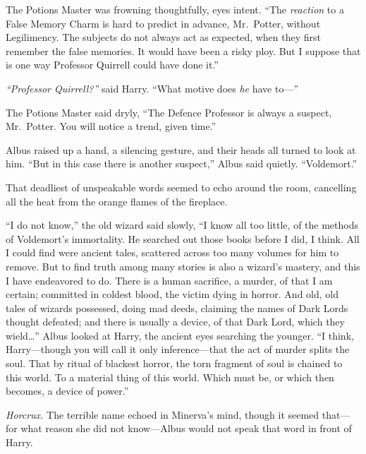The Potions Master was frowning thoughtfully, eyes intent. ``The
\emph{reaction} to a False Memory Charm is hard to predict in advance,
Mr.~Potter, without Legilimency. The subjects do not always act as
expected, when they first remember the false memories. It would have
been a risky ploy. But I suppose that is one way Professor Quirrell
could have done it.''

\emph{``Professor Quirrell?''} said Harry. ``What motive does \emph{he}
have to---''

The Potions Master said dryly, ``The Defence Professor is always a
suspect, Mr.~Potter. You will notice a trend, given time.''

Albus raised up a hand, a silencing gesture, and their heads all turned
to look at him. ``But in this case there is another suspect,'' Albus
said quietly. ``Voldemort.''

That deadliest of unspeakable words seemed to echo around the room,
cancelling all the heat from the orange flames of the fireplace.

``I do not know,'' the old wizard said slowly, ``I know all too little,
of the methods of Voldemort's immortality. He searched out those books
before I did, I think. All I could find were ancient tales, scattered
across too many volumes for him to remove. But to find truth among many
stories is also a wizard's mastery, and this I have endeavored to do.
There is a human sacrifice, a murder, of that I am certain; committed in
coldest blood, the victim dying in horror. And old, old tales of wizards
possessed, doing mad deeds, claiming the names of Dark Lords thought
defeated; and there is usually a device, of that Dark Lord, which they
wield\ldots{}'' Albus looked at Harry, the ancient eyes searching the
younger. ``I think, Harry---though you will call it only
inference---that the act of murder splits the soul. That by ritual of
blackest horror, the torn fragment of soul is chained to this world. To
a material thing of this world. Which must be, or which then becomes, a
device of power.''

\emph{Horcrux.} The terrible name echoed in Minerva's mind, though it
seemed that---for what reason she did not know---Albus would not speak
that word in front of Harry.

